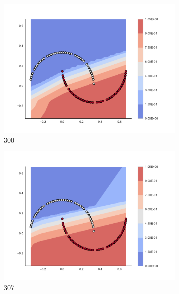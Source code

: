 \begin{figure}[h]
\begin{subfigure}[b]{0.09\textwidth}
    \includegraphics[clip, trim=2.35cm 1.75cm 4.5cm 0cm,width=\textwidth]{img/convergence/300.pdf}
    \caption{300}
    \label{fig:convergence_300}
\end{subfigure}
%
\begin{subfigure}[b]{0.09\textwidth}
    \includegraphics[clip, trim=2.35cm 1.75cm 4.5cm 0cm,width=\textwidth]{img/convergence/307.pdf}
    \caption{307}
    \label{fig:convergence_307}
\end{subfigure}
%
\begin{subfigure}[b]{0.09\textwidth}

\end{subfigure}
\end{figure}
